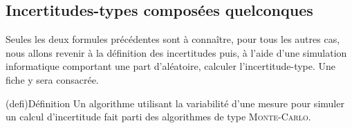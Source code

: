 \documentclass[../main/main.tex]{subfiles}
\begin{document}
\subsection{Incertitudes-types composées quelconques}
Seules les deux formules précédentes sont à connaître, pour tous les autres cas,
nous allons revenir à la définition des incertitudes puis, à l'aide d'une
simulation informatique comportant une part d'aléatoire, calculer
l'incertitude-type. Une fiche y sera consacrée.
\begin{tcb}(defi){Définition}
	Un algorithme utilisant la variabilité d'une mesure pour simuler un calcul
	d'incertitude fait parti des algorithmes de type \textsc{Monte-Carlo}.
\end{tcb}
\end{document}
